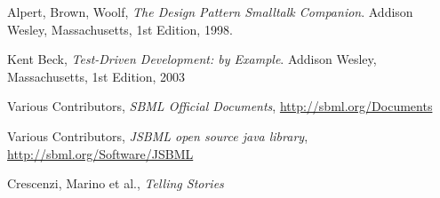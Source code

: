 \begin{thebibliography}{99}

  Alpert, Brown, Woolf,
  \emph{The Design Pattern Smalltalk Companion}.
  Addison Wesley, Massachusetts,
  1st Edition,
  1998.

  Kent Beck,
  \emph{Test-Driven Development: by Example}.
  Addison Wesley, Massachusetts,
  1st Edition,
  2003

  Various Contributors,
  \emph{SBML Official Documents}, \url{http://sbml.org/Documents}

 Various Contributors, \emph{JSBML open
    source java library}, \url{http://sbml.org/Software/JSBML}

  Crescenzi, Marino et al.,
  \emph{Telling Stories}

\end{thebibliography}